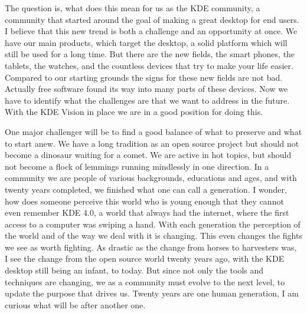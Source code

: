 The question is, what does this mean for us as the KDE community, a community that started around the goal of making a great desktop for end users. I believe that this new trend is both a challenge and an opportunity at once. We have our main products, which target the desktop, a solid platform which will still be used for a long time. But there are the new fields, the smart phones, the tablets, the watches, and the countless devices that try to make your life easier. Compared to our starting grounds the signs for these new fields are not bad. Actually free software found its way into many parts of these devices. Now we have to identify what the challenges are that we want to address in the future. With the KDE Vision in place we are in a good position for doing this.

One major challenger will be to find a good balance of what to preserve and what to start anew. We have a long tradition as an open source project but should not become a dinosaur waiting for a comet. We are active in hot topics, but should not become a flock of lemmings running mindlessly in one direction. In a community we are people of various backgrounds, educations and ages, and with twenty years completed, we finished what one can call a generation. I wonder, how does someone perceive this world who is young enough that they cannot even remember KDE 4.0, a world that always had the internet, where the first access to a computer was swiping a hand. With each generation the perception of the world and of the way we deal with it is changing. This even changes the fights we see as worth fighting. As drastic as the change from horses to harvesters was, I see the change from the open source world twenty years ago, with the KDE desktop still being an infant, to today. But since not only the tools and techniques are changing, we as a community must evolve to the next level, to update the purpose that drives us. Twenty years are one human generation, I am curious what will be after another one.
